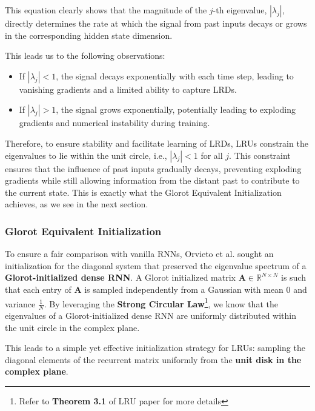\documentclass[12pt,a4paper]{report}
\begin{document}
This equation clearly shows that the magnitude of the $j$-th eigenvalue, $|\lambda_j|$, directly determines the rate at which the signal from past inputs decays or grows in the corresponding hidden state dimension.

\medskip

This leads us to the following observations:
\begin{itemize}
    \item If $|\lambda_j| < 1$, the signal decays exponentially with each time step, leading to vanishing gradients and a limited ability to capture LRDs.
    \item If $|\lambda_j| > 1$, the signal grows exponentially, potentially leading to exploding gradients and numerical instability during training.
\end{itemize}

\medskip

Therefore, to ensure stability and facilitate learning of LRDs, LRUs constrain the eigenvalues to lie within the unit circle, i.e., $|\lambda_j| < 1$ for all $j$. This constraint ensures that the influence of past inputs gradually decays, preventing exploding gradients while still allowing information from the distant past to contribute to the current state. This is exactly what the Glorot Equivalent Initialization achieves, as we see in the next section.


\subsubsection{Glorot Equivalent Initialization}
To ensure a fair comparison with vanilla RNNs, Orvieto et al. \cite{lru} sought an initialization for the diagonal system that preserved the eigenvalue spectrum of a \textbf{Glorot-initialized dense RNN}. A Glorot initialized matrix \cite{glorotinit} $\mathbf{A} \in \mathbb{R}^{N \times N}$ is such that each entry of $\mathbf{A}$ is sampled independently from a Gaussian with mean $0$ and variance $\frac{1}{N}$. By leveraging the \textbf{Strong Circular Law}\footnote{Refer to \textbf{Theorem 3.1} of LRU paper \cite{lru} for more details}, we know that the eigenvalues of a Glorot-initialized dense RNN are uniformly distributed within the unit circle in the complex plane.

\medskip

This leads to a simple yet effective initialization strategy for LRUs: sampling the diagonal elements of the recurrent matrix uniformly from the \textbf{unit disk in the complex plane}.
\end{document}
